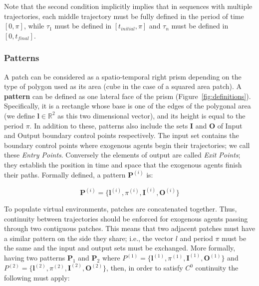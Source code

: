 Note that the second condition implicitly implies that in sequences with multiple trajectories, each middle trajectory must be fully defined in the period of time $[0,\pi]$, while $\tau_1$ must be defined in $[t_{initial},\pi]$ and $\tau_n$ must be defined in $[0, t_{final}]$.



\subsubsection{Patterns}

% 
A patch can be considered as a spatio-temporal right prism depending on the type of polygon used as its area (cube in the case of a squared area patch).
A \textbf{pattern} can be defined as one lateral face of the prism (Figure~\ref{fig:definitions}).
Specifically, it is a rectangle whose base is one of the edges of the polygonal area (we define $\mathbf{l} \in \mathbb{R}^2$ as this two dimensional vector), and its height is equal to the period $\pi$.
In addition to these, patterns also include the sets $\mathbf{I}$ and $\mathbf{O}$ of Input and Output boundary control points respectively.
The input set contains the boundary control points where exogenous agents begin their trajectories; we call these \emph{Entry Points}.
Conversely the elements of output are called \emph{Exit Points}; they establish the position in time and space that the exogenous agents finish their paths.
Formally defined, a pattern $\mathbf{P}^{(i)}$ is:

\begin{equation}
	\mathbf{P}^{(i)} = \{\mathbf{l}^{(i)}, \pi^{(i)}, \mathbf{I}^{(i)}, \mathbf{O}^{(i)}\}
\end{equation}

To populate virtual environments, patches are concatenated together.
Thus, continuity between trajectories should be enforced for exogenous agents passing through two contiguous patches.
This means that two adjacent patches must have a similar pattern on the side they share; i.e., the vector $l$ and period $\pi$ must be the same and the input and output sets must be exchanged.
More formally, having two patterns $\mathbf{P}_1$ and $\mathbf{P}_2$ where
$P^{(1)}=\{\mathbf{l}^{(1)}, \pi^{(1)}, \mathbf{I}^{(1)}, \mathbf{O}^{(1)}\}$ and~
$P^{(2)}=\{\mathbf{l}^{(2)}, \pi^{(2)}, \mathbf{I}^{(2)}, \mathbf{O}^{(2)}\}$, then, in order to satisfy $C^0$ continuity the following must apply:

